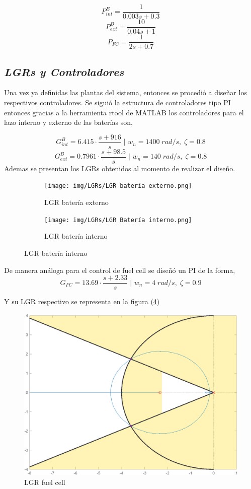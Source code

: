 \begin{equation}
    P^B_{int} = \frac{1}{0.003s+0.3}
\end{equation}
\begin{equation}
    P^B_{ext} = \frac{10}{0.04s+1}
\end{equation}
\begin{equation}
    P_{FC} = \frac{1}{2s+0.7}
\end{equation}

\newpage

\subsection{\textit{LGRs y Controladores}}
Una vez ya definidas las plantas del sistema, entonces se procedió a diseñar los respectivos controladores. Se siguió la estructura de controladores tipo PI entonces gracias a la herramienta rtool de MATLAB los controladores para el lazo interno y externo de las baterías son,

\begin{equation}
    G^B_{int} = 6.415\cdot \frac{s+916}{s} \;\text{| } w_{n} = 1400\;  rad/s, \;\zeta = 0.8
\end{equation}
\begin{equation}
    G^B_{ext} = 0.7961\cdot \frac{s+98.5}{s} \;\text{| } w_{n} = 140\;  rad/s, \;\zeta = 0.8
\end{equation}
Ademas se presentan los LGRs obtenidos al momento de realizar el diseño.
\begin{figure}[htbp]
    \centering
    \begin{subfigure}[b]{0.48\linewidth}
        \texttt{[image: img/LGRs/LGR batería externo.png]}
        \caption{LGR batería externo}
        \label{fig:externa}
    \end{subfigure}
    \hfill
    \begin{subfigure}[b]{0.48\linewidth}
        \texttt{[image: img/LGRs/LGR Batería interno.png]}
        \caption{LGR batería interno}
        \label{fig:interna}    
    \end{subfigure}
    
\end{figure}

De manera análoga para el control de fuel cell se diseñó un PI de la forma,
\begin{equation}
    G_{FC} = 13.69\cdot \frac{s+2.33}{s} \;\text{| } w_{n} = 4\; rad/s, \;\zeta = 0.9
\end{equation}

Y su LGR respectivo se representa en la figura (\ref{fig:LGR fuel cell})
\begin{figure}[H]
    \centering
    \includegraphics[width=0.5\linewidth]{img/LGRs/LGR fuel cell.png}
    \caption{LGR fuel cell}
    \label{fig:LGR fuel cell}
\end{figure}


\newpage